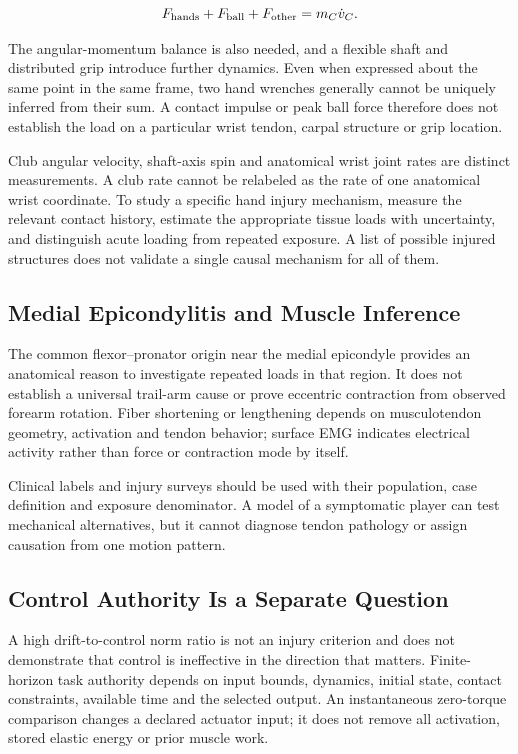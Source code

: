 \[
F_{\rm hands}+F_{\rm ball}+F_{\rm other}=m_C\dot v_C.
\]

The angular-momentum balance is also needed, and a flexible shaft and distributed grip introduce further dynamics. Even when expressed about the same point in the same frame, two hand wrenches generally cannot be uniquely inferred from their sum. A contact impulse or peak ball force therefore does not establish the load on a particular wrist tendon, carpal structure or grip location.

Club angular velocity, shaft-axis spin and anatomical wrist joint rates are distinct measurements. A club rate cannot be relabeled as the rate of one anatomical wrist coordinate. To study a specific hand injury mechanism, measure the relevant contact history, estimate the appropriate tissue loads with uncertainty, and distinguish acute loading from repeated exposure. A list of possible injured structures does not validate a single causal mechanism for all of them.

\subsection{Medial Epicondylitis and Muscle Inference}\label{medial-epicondylitis-and-muscle-inference}

The common flexor--pronator origin near the medial epicondyle provides an anatomical reason to investigate repeated loads in that region. It does not establish a universal trail-arm cause or prove eccentric contraction from observed forearm rotation. Fiber shortening or lengthening depends on musculotendon geometry, activation and tendon behavior; surface EMG indicates electrical activity rather than force or contraction mode by itself.

Clinical labels and injury surveys should be used with their population, case definition and exposure denominator. A model of a symptomatic player can test mechanical alternatives, but it cannot diagnose tendon pathology or assign causation from one motion pattern.

\subsection{Control Authority Is a Separate Question}\label{control-authority-is-a-separate-question}

A high drift-to-control norm ratio is not an injury criterion and does not demonstrate that control is ineffective in the direction that matters. Finite-horizon task authority depends on input bounds, dynamics, initial state, contact constraints, available time and the selected output. An instantaneous zero-torque comparison changes a declared actuator input; it does not remove all activation, stored elastic energy or prior muscle work.


